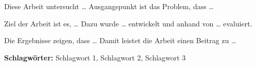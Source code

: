 

Diese Arbeit untersucht \ldots{} Ausgangspunkt ist das Problem, dass \ldots

Ziel der Arbeit ist es, \ldots{} Dazu wurde \ldots{} entwickelt und anhand von \ldots{} evaluiert.

Die Ergebnisse zeigen, dass \ldots{} Damit leistet die Arbeit einen Beitrag zu \ldots

\medskip
\noindent\textbf{Schlagwörter:} Schlagwort 1, Schlagwort 2, Schlagwort 3

